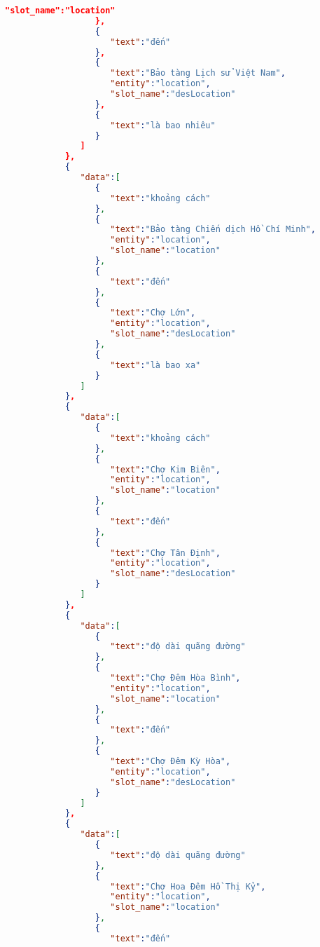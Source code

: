 \begin{lstlisting}[language=json,firstnumber=1]
                     "slot_name":"location"
                  },
                  {
                     "text":"đến"
                  },
                  {
                     "text":"Bảo tàng Lịch sử Việt Nam",
                     "entity":"location",
                     "slot_name":"desLocation"
                  },
                  {
                     "text":"là bao nhiêu"
                  }
               ]
            },
            {
               "data":[
                  {
                     "text":"khoảng cách"
                  },
                  {
                     "text":"Bảo tàng Chiến dịch Hồ Chí Minh",
                     "entity":"location",
                     "slot_name":"location"
                  },
                  {
                     "text":"đến"
                  },
                  {
                     "text":"Chợ Lớn",
                     "entity":"location",
                     "slot_name":"desLocation"
                  },
                  {
                     "text":"là bao xa"
                  }
               ]
            },
            {
               "data":[
                  {
                     "text":"khoảng cách"
                  },
                  {
                     "text":"Chợ Kim Biên",
                     "entity":"location",
                     "slot_name":"location"
                  },
                  {
                     "text":"đến"
                  },
                  {
                     "text":"Chợ Tân Định",
                     "entity":"location",
                     "slot_name":"desLocation"
                  }
               ]
            },
            {
               "data":[
                  {
                     "text":"độ dài quãng đường"
                  },
                  {
                     "text":"Chợ Đêm Hòa Bình",
                     "entity":"location",
                     "slot_name":"location"
                  },
                  {
                     "text":"đến"
                  },
                  {
                     "text":"Chợ Đêm Kỳ Hòa",
                     "entity":"location",
                     "slot_name":"desLocation"
                  }
               ]
            },
            {
               "data":[
                  {
                     "text":"độ dài quãng đường"
                  },
                  {
                     "text":"Chợ Hoa Đêm Hồ Thị Kỷ",
                     "entity":"location",
                     "slot_name":"location"
                  },
                  {
                     "text":"đến"

\end{lstlisting}
